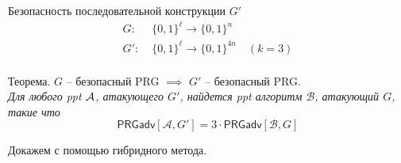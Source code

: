 \documentclass[usenames,dvipsnames,8pt,aspectratio=169]{beamer}
\begin{document}
\begin{frame}{Безопасность последовательной конструкции $G'$}
\LARGE
\vspace{-20pt}
\begin{align*}
 G : \; &\{0,1\}^{\ell}  \rightarrow \{0,1\}^{n}  \\
G': \; & \{0,1\} ^{\ell}  \rightarrow \{0,1\}^{4n} \quad (k=3) \\
\end{align*} 


{\color{Orange} Теорема.} $G$ -- безопасный PRG $\implies$ $G'$ -- безопасный PRG.\\[5pt]
\emph{Для любого ppt $\mathcal{A}$, атакующего $G'$, найдется ppt алгоритм $\mathcal{B}$, атакующий $G$, такие что}
\[
	\mathsf{PRGadv} \left[  \mathcal{A}, G' \right ] = 3 \cdot \mathsf{PRGadv} \left[  \mathcal{B}, G \right ]
\]

\vspace{20pt}
Докажем с помощью {\color{Orange} гибридного } метода.

\end{frame}
\end{document}
